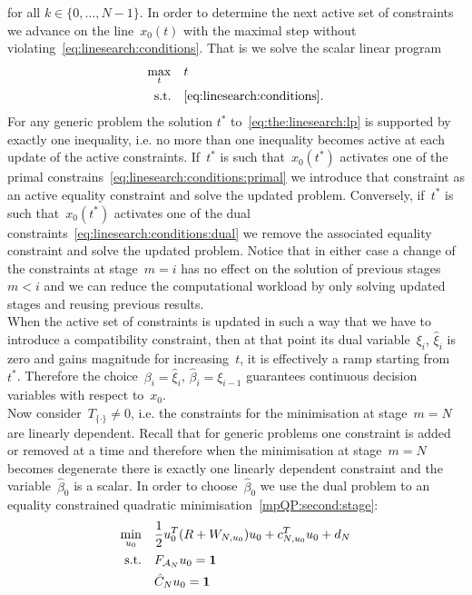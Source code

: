 %
for all $k\in\{0,\dots,N-1\}$.
%
In order to determine the next active set of constraints we advance on the line~$x_0(t)$ with the maximal step without violating~\eqref{eq:linesearch:conditions}.
%
That is we solve the scalar linear program
%
\begin{equation}\label{eq:the:linesearch:lp}
	\begin{aligned}\max_t&\quad t\\
	\text{s.t.}&\quad \eqref{eq:linesearch:conditions}.
	\end{aligned}
\end{equation}
%
For any generic problem the solution $t^\ast$ to~\eqref{eq:the:linesearch:lp} is supported by exactly one inequality, i.e. no more than one inequality becomes active at each update of the active constraints.
%
If~$t^\ast$ is such that~$x_0(t^\ast)$ activates one of the primal constrains~\eqref{eq:linesearch:conditions:primal} we introduce that constraint as an active equality constraint and solve the updated problem.
%
Conversely, if~$t^\ast$ is such that~$x_0(t^\ast)$ activates one of the dual constraints~\eqref{eq:linesearch:conditions:dual} we remove the associated equality constraint and solve the updated problem.
%
Notice that in either case a change of the constraints at stage~$m=i$ has no effect on the solution of previous stages~$m<i$ and we can reduce the computational workload by only solving updated stages and reusing previous results.
%
\\[1em]
%
When the active set of constraints is updated in such a way that we have to introduce a compatibility constraint, then at that point its dual variable~$\xi_i$, $\hat\xi_i$ is zero and gains magnitude for increasing~$t$, it is effectively a ramp starting from~$t^\ast$.
%
Therefore the choice~$\beta_i = \hat\xi_i$, $\hat\beta_i = \xi_{i-1}$ guarantees continuous decision variables with respect to~$x_0$.
%
\\[1em]
%
\mysplit Now consider~$T_{\{\cdot\}}\neq0$, i.e. the constraints for the minimisation at stage~$m=N$ are linearly dependent.
%
Recall that for generic problems one constraint is added or removed at a time and therefore when the minimisation at stage~$m=N$ becomes degenerate there is exactly one linearly dependent constraint and the variable~$\hat\beta_0$ is a scalar.
%
In order to choose~$\hat\beta_0$ we use the dual problem to an equality constrained quadratic minimisation~\eqref{mpQP:second:stage}:
%
\begin{equation}\label{eq:non:trivial:beta:hat}\begin{aligned}
	\min_{u_0}&\quad \frac{1}{2}u_0^T(R+W_{N,u_0})u_0+c_{N,u_0}^Tu_0+d_N\\
	\text{s.t.}&\quad F_{\mathcal A_N}u_0 = \mathbf{1}\\
	&\quad \hat C_N u_0 = \mathbf{1}
\end{aligned}\end{equation}
